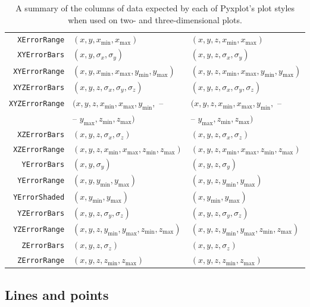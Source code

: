 \begin{table}
\begin{tabular}{|rll|}
{\tt XErrorRange} & $(x,y,x_\mathrm{min},x_\mathrm{max})$ & $(x,y,z,x_\mathrm{min},x_\mathrm{max})$ \\
{\tt XYErrorBars} & $(x,y,\sigma_x,\sigma_y)$ & $(x,y,z,\sigma_x,\sigma_y)$ \\
{\tt XYErrorRange} & $(x,y,x_\mathrm{min},x_\mathrm{max},y_\mathrm{min},y_\mathrm{max})$ & $(x,y,z,x_\mathrm{min},x_\mathrm{max},y_\mathrm{min},y_\mathrm{max})$ \\
{\tt XYZErrorBars} & $(x,y,z,\sigma_x,\sigma_y,\sigma_z)$ & $(x,y,z,\sigma_x,\sigma_y,\sigma_z)$ \\
{\tt XYZErrorRange} & $(x,y,z,x_\mathrm{min},x_\mathrm{max},y_\mathrm{min},$ -- & $(x,y,z,x_\mathrm{min},x_\mathrm{max},y_\mathrm{min},$ -- \\
                    & -- $y_\mathrm{max},z_\mathrm{min},z_\mathrm{max})$ & -- $y_\mathrm{max},z_\mathrm{min},z_\mathrm{max})$ \\
{\tt XZErrorBars} & $(x,y,z,\sigma_x,\sigma_z)$ & $(x,y,z,\sigma_x,\sigma_z)$ \\
{\tt XZErrorRange} & $(x,y,z,x_\mathrm{min},x_\mathrm{max},z_\mathrm{min},z_\mathrm{max})$ & $(x,y,z,x_\mathrm{min},x_\mathrm{max},z_\mathrm{min},z_\mathrm{max})$ \\
{\tt YErrorBars} & $(x,y,\sigma_y)$ & $(x,y,z,\sigma_y)$ \\
{\tt YErrorRange} & $(x,y,y_\mathrm{min},y_\mathrm{max})$ & $(x,y,z,y_\mathrm{min},y_\mathrm{max})$ \\
{\tt YErrorShaded} & $(x,y_\mathrm{min},y_\mathrm{max})$ & $(x,y_\mathrm{min},y_\mathrm{max})$ \\
{\tt YZErrorBars} & $(x,y,z,\sigma_y,\sigma_z)$ & $(x,y,z,\sigma_y,\sigma_z)$ \\
{\tt YZErrorRange} & $(x,y,z,y_\mathrm{min},y_\mathrm{max},z_\mathrm{min},z_\mathrm{max})$ & $(x,y,z,y_\mathrm{min},y_\mathrm{max},z_\mathrm{min},z_\mathrm{max})$ \\
{\tt ZErrorBars} & $(x,y,z,\sigma_z)$ & $(x,y,z,\sigma_z)$ \\
{\tt ZErrorRange} & $(x,y,z,z_\mathrm{min},z_\mathrm{max})$ & $(x,y,z,z_\mathrm{min},z_\mathrm{max})$ \\
\hline
\end{tabular}
\caption{A summary of the columns of data expected by each of Pyxplot's plot styles when used on two- and three-dimensional plots.}
\label{tab:plot_style_columns}
\end{table}

\subsection{Lines and points}

